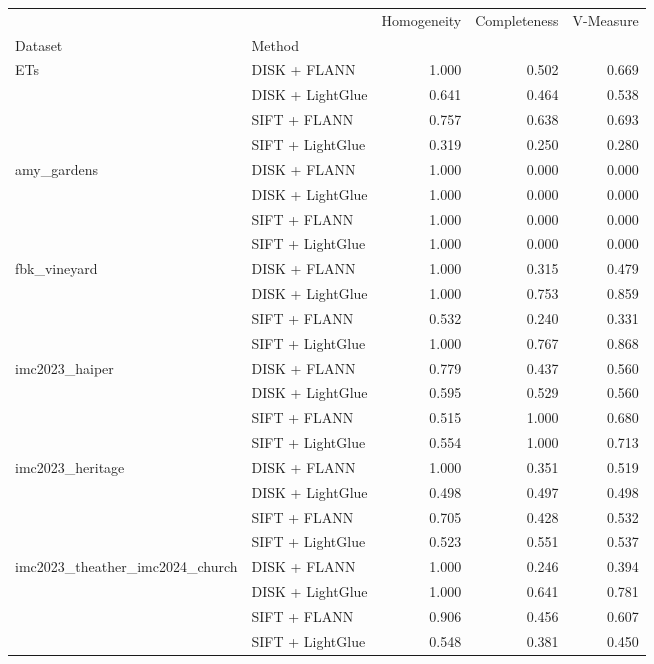 \documentclass[report.tex]{subfiles}
\begin{document}
\begin{longtable}{llrrr}
 &  & Homogeneity & Completeness & V-Measure \\
Dataset & Method &  &  &  \\
\midrule
\multirow[t]{4}{*}{ETs} & DISK + FLANN & 1.000 & 0.502 & 0.669 \\
 & DISK + LightGlue & 0.641 & 0.464 & 0.538 \\
 & SIFT + FLANN & 0.757 & 0.638 & 0.693 \\
 & SIFT + LightGlue & 0.319 & 0.250 & 0.280 \\
\cline{1-5}
\multirow[t]{4}{*}{amy\_gardens} & DISK + FLANN & 1.000 & 0.000 & 0.000 \\
 & DISK + LightGlue & 1.000 & 0.000 & 0.000 \\
 & SIFT + FLANN & 1.000 & 0.000 & 0.000 \\
 & SIFT + LightGlue & 1.000 & 0.000 & 0.000 \\
\cline{1-5}
\multirow[t]{4}{*}{fbk\_vineyard} & DISK + FLANN & 1.000 & 0.315 & 0.479 \\
 & DISK + LightGlue & 1.000 & 0.753 & 0.859 \\
 & SIFT + FLANN & 0.532 & 0.240 & 0.331 \\
 & SIFT + LightGlue & 1.000 & 0.767 & 0.868 \\
\cline{1-5}
\multirow[t]{4}{*}{imc2023\_haiper} & DISK + FLANN & 0.779 & 0.437 & 0.560 \\
 & DISK + LightGlue & 0.595 & 0.529 & 0.560 \\
 & SIFT + FLANN & 0.515 & 1.000 & 0.680 \\
 & SIFT + LightGlue & 0.554 & 1.000 & 0.713 \\
\cline{1-5}
\multirow[t]{4}{*}{imc2023\_heritage} & DISK + FLANN & 1.000 & 0.351 & 0.519 \\
 & DISK + LightGlue & 0.498 & 0.497 & 0.498 \\
 & SIFT + FLANN & 0.705 & 0.428 & 0.532 \\
 & SIFT + LightGlue & 0.523 & 0.551 & 0.537 \\
\cline{1-5}
\multirow[t]{4}{*}{imc2023\_theather\_imc2024\_church} & DISK + FLANN & 1.000 & 0.246 & 0.394 \\
 & DISK + LightGlue & 1.000 & 0.641 & 0.781 \\
 & SIFT + FLANN & 0.906 & 0.456 & 0.607 \\
 & SIFT + LightGlue & 0.548 & 0.381 & 0.450 \\

\end{longtable}
\end{document}
